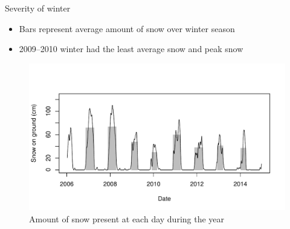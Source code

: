 \documentclass{beamer}
\begin{document}
\begin{frame}{Severity of winter}

\vspace{5mm}
\begin{itemize}
\item Bars represent average amount of snow over winter season
\item 2009--2010 winter had the least average snow and peak snow
\end{itemize}

\begin{figure}
\vspace{-12mm}
\includegraphics[width=1.0\textwidth]{report-barplots}
\vspace{-5mm}
\caption{{\footnotesize Amount of snow present at each day during the year}}
\end{figure}

\end{frame}
\end{document}
